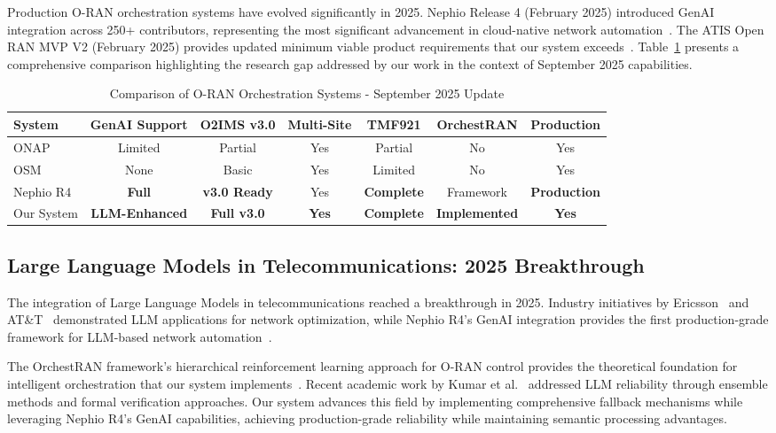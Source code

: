 Production O-RAN orchestration systems have evolved significantly in 2025. Nephio Release 4 (February 2025) introduced GenAI integration across 250+ contributors, representing the most significant advancement in cloud-native network automation~\cite{nephio2025r4}. The ATIS Open RAN MVP V2 (February 2025) provides updated minimum viable product requirements that our system exceeds~\cite{atis2025mvp}. Table~\ref{tab:oran_comparison} presents a comprehensive comparison highlighting the research gap addressed by our work in the context of September 2025 capabilities.

\begin{table}[htbp]
\centering
\caption{Comparison of O-RAN Orchestration Systems - September 2025 Update}
\label{tab:oran_comparison}
\begin{tabular}{|p{1.5cm}|c|c|c|c|c|c|}
\hline
\textbf{System} & \textbf{GenAI Support} & \textbf{O2IMS v3.0} & \textbf{Multi-Site} & \textbf{TMF921} & \textbf{OrchestRAN} & \textbf{Production} \\
\hline
ONAP & Limited & Partial & Yes & Partial & No & Yes \\
\hline
OSM & None & Basic & Yes & Limited & No & Yes \\
\hline
Nephio R4 & \textbf{Full} & \textbf{v3.0 Ready} & Yes & \textbf{Complete} & Framework & \textbf{Production} \\
\hline
Our System & \textbf{LLM-Enhanced} & \textbf{Full v3.0} & \textbf{Yes} & \textbf{Complete} & \textbf{Implemented} & \textbf{Yes} \\
\hline
\end{tabular}
\end{table}

\subsection{Large Language Models in Telecommunications: 2025 Breakthrough}

The integration of Large Language Models in telecommunications reached a breakthrough in 2025. Industry initiatives by Ericsson~\cite{ericsson2025llm} and AT\&T~\cite{att2025genai} demonstrated LLM applications for network optimization, while Nephio R4's GenAI integration provides the first production-grade framework for LLM-based network automation~\cite{lf2025nephio}.

The OrchestRAN framework's hierarchical reinforcement learning approach for O-RAN control provides the theoretical foundation for intelligent orchestration that our system implements~\cite{liu2025hierarchical}. Recent academic work by Kumar et al.~\cite{kumar2025ensemble} addressed LLM reliability through ensemble methods and formal verification approaches. Our system advances this field by implementing comprehensive fallback mechanisms while leveraging Nephio R4's GenAI capabilities, achieving production-grade reliability while maintaining semantic processing advantages.

